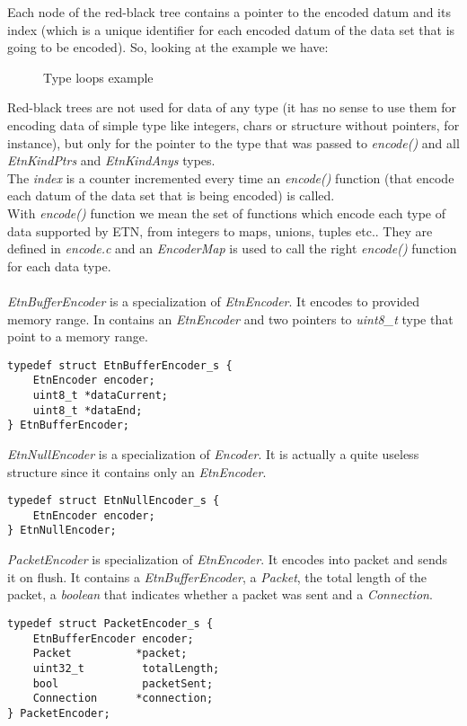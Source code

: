 Each node of the red-black tree contains a pointer to the encoded datum and its index (which is a unique identifier for each encoded datum of the data set that is going to be encoded). So, looking at the example we have:
\begin{figure}[H]
\centering
{}

\caption{Type loops example}
\end{figure}
Red-black trees are not used for data of any type (it has no sense to use them for encoding data of simple type like integers, chars or structure without pointers, for instance), but only for the pointer to the type that was passed to \emph{encode()} and all \emph{EtnKindPtrs} and \emph{EtnKindAnys} types. \\
The \emph{index} is a counter incremented every time an \emph{encode()} function (that encode each datum of the data set that is being encoded) is called. \\
With \emph{encode()} function we mean the set of functions which encode each type of data supported by ETN, from integers to maps, unions, tuples etc.. They are defined in \emph{encode.c} and an \emph{EncoderMap} is used to call the right \emph{encode()} function for each data type.\\\\
\emph{EtnBufferEncoder} is a specialization of \emph{EtnEncoder}. It encodes to provided memory range. In contains an \emph{EtnEncoder} and two pointers to \emph{uint8\_t} type that point to a memory range.
\begin{lstlisting}
typedef struct EtnBufferEncoder_s {
	EtnEncoder encoder;
	uint8_t *dataCurrent;
	uint8_t *dataEnd;
} EtnBufferEncoder;
\end{lstlisting}
\emph{EtnNullEncoder} is a specialization of \emph{Encoder}. It is actually a quite useless structure since it contains only an \emph{EtnEncoder}.
\begin{lstlisting}
typedef struct EtnNullEncoder_s {
	EtnEncoder encoder;
} EtnNullEncoder;
\end{lstlisting}
\emph{PacketEncoder} is specialization of \emph{EtnEncoder}. It encodes into packet and sends it on flush. It contains a \emph{EtnBufferEncoder}, a \emph{Packet}, the total length of the packet, a \emph{boolean} that indicates whether a packet was sent and a \emph{Connection}.
\begin{lstlisting}
typedef struct PacketEncoder_s {
	EtnBufferEncoder encoder;
	Packet          *packet;
	uint32_t         totalLength;
	bool             packetSent;
	Connection      *connection;
} PacketEncoder;
\end{lstlisting}